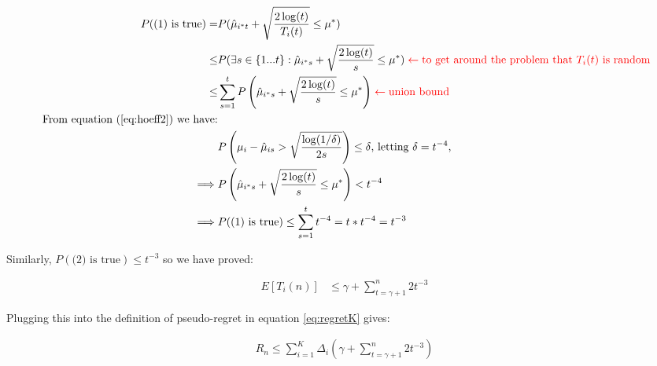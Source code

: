 \documentclass{article}
\newcommand{\eqn}[1]{\begin{align}#1\end{align}}
\newcommand{\eq}[1]{\begin{align*}#1\end{align*}}
\theoremstyle{plain}
\theoremstyle{definition}
\begin{document}
\eq {
P(\text{(1) is true})  = & P(\hat{\mu}_{i^*t} + \sqrt{\frac{2 \log(t)}{T_i(t)}} \leq \mu^*)\\
\leq & P(\exists s \in \{1...t\} : \hat{\mu}_{i^*s}+ \sqrt{\frac{2 \log(t)}{s}} \leq \mu^*) \color{red} \leftarrow \text {to get around the problem that $T_i(t)$ is random}\\
\leq & \sum_{s=1}^t P\left( \hat{\mu}_{i^*s}+ \sqrt{\frac{2 \log(t)}{s}} \leq \mu^* \right) \color{red} \leftarrow \text{union bound}\\
\text{ From equation (\ref{eq:hoeff2}) we have:}\\
& P\left(\mu_{i} - \hat \mu_{is} > \sqrt{\frac{\log(1/\delta)}{2s}}\right) \leq \delta \text{, letting $\delta = t^{-4}$,}\\
\implies & P\left( \hat{\mu}_{i^*s}+\sqrt{\frac{2 \log(t)}{s}}\leq \mu^* \right) < t^{-4}\\
\implies & P(\text{(1) is true}) \leq \sum_{s=1}^t t^{-4} = t*t^{-4} =  t^{-3}
}

Similarly, $P(\text{(2) is true}) \leq t^{-3}$ so we have proved: 

\eqn {
 E\left[T_{i}(n)\right] & \leq \gamma + \sum_{t=\gamma+1}^n 2t^{-3}
}

Plugging this into the definition of pseudo-regret in equation \ref{eq:regretK} gives:


\eqn {
R_n \leq \sum_{i=1}^K \Delta_i  \left(\gamma + \sum_{t=\gamma+1}^n 2t^{-3}\right) 
}
\end{document}
